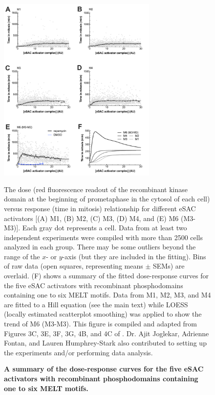 \begin{figure}
    \centering
    \includegraphics[width=0.7\textwidth]{chapters/figures/DoseResponse.pdf}
    \caption{\textbf{A summary of the dose-response curves for the five eSAC activators with recombinant phosphodomains containing one to six MELT motifs.}}
    \noindent\justifying The dose (red fluorescence readout of the recombinant  kinase domain at the beginning of prometaphase in the cytosol of each cell) versus response (time in mitosis) relationship for different eSAC activators [(A) M1, (B) M2, (C) M3, (D) M4, and (E) M6 (M3-M3)]. Each gray dot represents a cell. Data from at least two independent experiments were compiled with more than \SI{2500}{} cells analyzed in each group. There may be some outliers beyond the range of the $x$- or $y$-axis (but they are included in the fitting). Bins of raw data (open squares, representing means $\pm$ SEMs) are overlaid. (F) shows a summary of the fitted dose-response curves for the five eSAC activators with recombinant phosphodomains containing one to six MELT motifs. Data from M1, M2, M3, and M4 are fitted to a Hill equation (see the main text) while LOESS (locally estimated scatterplot smoothing) was applied to show the trend of M6 (M3-M3). This figure is compiled and adapted from Figures 3C, 3E, 3F, 3G, 4B, and 4C of \cite{eSAC}. Dr. Ajit Joglekar, Adrienne Fontan, and Lauren Humphrey-Stark also contributed to setting up the experiments and/or performing data analysis.
    \label{DoseResponse}
\end{figure}

